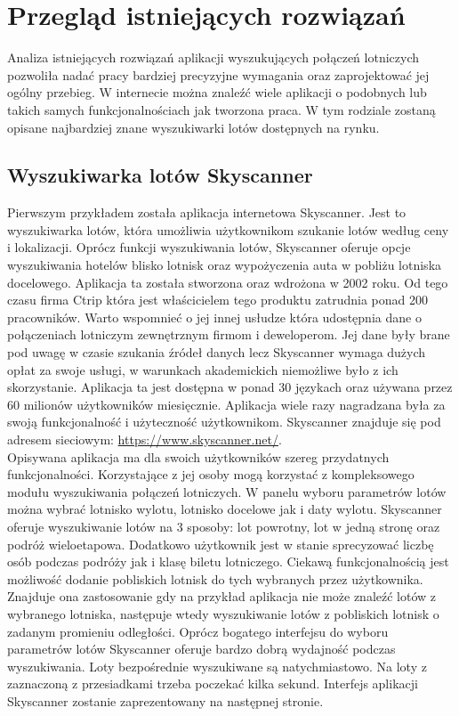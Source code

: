 \documentclass[12pt, twoside]{report}
\begin{document}
\chapter{Przegląd istniejących rozwiązań}
Analiza istniejących rozwiązań aplikacji wyszukujących połączeń lotniczych pozwoliła nadać pracy bardziej precyzyjne wymagania oraz zaprojektować jej ogólny przebieg. W internecie można znaleźć wiele aplikacji o podobnych lub takich samych funkcjonalnościach jak tworzona praca. W tym rodziale zostaną opisane najbardziej znane wyszukiwarki lotów dostępnych na rynku. 
\section{Wyszukiwarka lotów Skyscanner}
Pierwszym przykładem została aplikacja internetowa Skyscanner. Jest to wyszukiwarka lotów, która umożliwia użytkownikom szukanie lotów według ceny i lokalizacji. Oprócz funkcji wyszukiwania lotów, Skyscanner oferuje opcje wyszukiwania hotelów blisko lotnisk oraz wypożyczenia auta w pobliżu lotniska docelowego. Aplikacja ta została stworzona oraz wdrożona w 2002 roku. Od tego czasu firma Ctrip która jest właścicielem tego produktu zatrudnia ponad 200 pracowników. Warto wspomnieć o jej innej usłudze która udostępnia dane o połączeniach lotniczym zewnętrznym firmom i deweloperom. Jej dane były brane pod uwagę w czasie szukania źródeł danych lecz Skyscanner wymaga dużych opłat za swoje usługi, w warunkach akademickich niemożliwe było z ich skorzystanie.
Aplikacja ta jest dostępna w ponad 30 językach oraz używana przez 60 milionów użytkowników miesięcznie. Aplikacja wiele razy nagradzana była za swoją funkcjonalność i użyteczność użytkownikom. Skyscanner znajduje się pod adresem sieciowym: 
\url{https://www.skyscanner.net/}.\\ \indent
Opisywana aplikacja ma dla swoich użytkowników szereg przydatnych funkcjonalności. Korzystające z jej osoby mogą korzystać z kompleksowego modułu wyszukiwania połączeń lotniczych. W panelu wyboru parametrów lotów można wybrać lotnisko wylotu, lotnisko docelowe jak i daty wylotu. Skyscanner oferuje wyszukiwanie lotów na 3 sposoby: lot powrotny, lot w jedną stronę oraz podróż wieloetapowa. Dodatkowo użytkownik jest w stanie sprecyzować liczbę osób podczas podróży jak i klasę biletu lotniczego. Ciekawą funkcjonalnością jest możliwość dodanie pobliskich lotnisk do tych wybranych przez użytkownika. Znajduje ona zastosowanie gdy na przykład aplikacja nie może znaleźć lotów z wybranego lotniska, następuje wtedy wyszukiwanie lotów z pobliskich lotnisk o zadanym promieniu odległości.
Oprócz bogatego interfejsu do wyboru parametrów lotów Skyscanner oferuje bardzo dobrą wydajność podczas wyszukiwania. Loty bezpośrednie wyszukiwane są natychmiastowo. Na loty z zaznaczoną z przesiadkami trzeba poczekać kilka sekund. Interfejs aplikacji Skyscanner zostanie zaprezentowany na następnej stronie.
\end{document}
